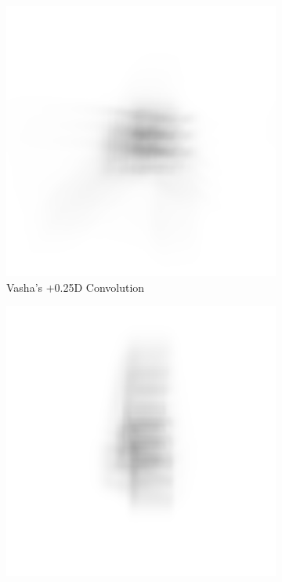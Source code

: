 \documentclass{article}
\begin{document}
\begin{figure}[H]
\begin{subfigure}{.3\textwidth}
  \centering
  \includegraphics[width=1\linewidth]{Vasha_R_G_0530_2_500_zer_025_5_PSF_convE.png}
  \caption{Vasha's +0.25D Convolution}
  \label{fig:vasha025d}
\end{subfigure}
\begin{subfigure}{.3\textwidth}
  \centering
  \includegraphics[width=1\linewidth]{Liz_R_G_0523_2_500_zer_025_5_PSF_convE.png}

\end{subfigure}
\end{figure}
\end{document}
